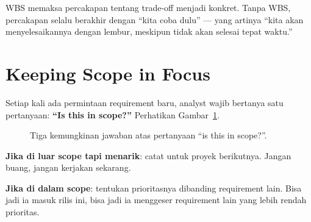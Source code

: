\documentclass[11pt,a4paper]{article}
\begin{document}
WBS memaksa percakapan tentang trade-off menjadi konkret. Tanpa WBS, percakapan selalu berakhir dengan ``kita coba dulu'' — yang artinya ``kita akan menyelesaikannya dengan lembur, meskipun tidak akan selesai tepat waktu.''

\section{Keeping Scope in Focus}

Setiap kali ada permintaan requirement baru, analyst wajib bertanya satu pertanyaan: \textbf{``Is this in scope?''} Perhatikan Gambar~\ref{fig:in-scope}.

\begin{figure}[H]
	\centering
	\caption{Tiga kemungkinan jawaban atas pertanyaan ``is this in scope?''.}
	\label{fig:in-scope}
\end{figure}

\textbf{Jika di luar scope tapi menarik}: catat untuk proyek berikutnya. Jangan buang, jangan kerjakan sekarang.

\textbf{Jika di dalam scope}: tentukan prioritasnya dibanding requirement lain. Bisa jadi ia masuk rilis ini, bisa jadi ia menggeser requirement lain yang lebih rendah prioritas.
\end{document}
